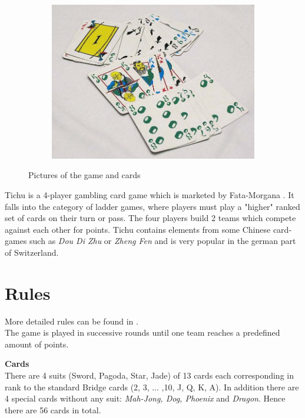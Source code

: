 \begin{figure}[ht]
\begin{center}
        \begin{subfigure}[h]{.5\textwidth}\includegraphics[width=\textwidth]{images/Tichu_cards}\end{subfigure}
    \end{center}
    \caption[Tichu the game]{Pictures of the game and cards}
\end{figure}
Tichu is a 4-player gambling card game which is marketed by Fata-Morgana \cite{fatamorgana}. It falls into the category of ladder games, where players must play a "higher" ranked set of cards on their turn or pass. The four players build 2 teams which compete against each other for points.
Tichu contains elements from some Chinese card-games such as \textit{Dou Di Zhu} or \textit{Zheng Fen} and is very popular in the german part of Switzerland.

\section{Rules}
More detailed rules can be found in \cite{fatamorgana, rules}.\\
The game is played in successive rounds until one team reaches a predefined amount of points.

\noindent\textbf{Cards} \\
There are 4 suits (Sword, Pagoda, Star, Jade) of 13 cards each corresponding in rank to the standard Bridge cards (2, 3, ... ,10, J, Q, K, A). In addition there are 4 special cards without any suit: \textit{Mah-Jong, Dog, Phoenix} and \textit{Dragon}. Hence there are 56 cards in total.


